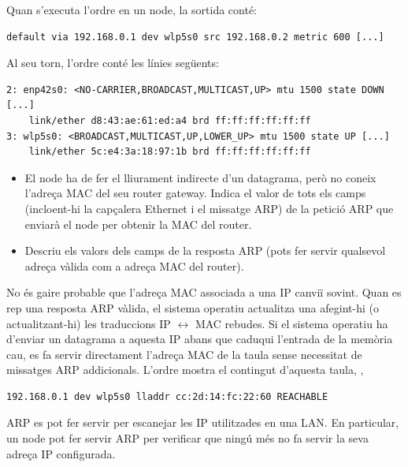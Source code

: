 \begin{exercise}
Quan s'executa l'ordre  en un node, la sortida conté:

\begin{verbatim}
default via 192.168.0.1 dev wlp5s0 src 192.168.0.2 metric 600 [...]
\end{verbatim}

Al seu torn, l'ordre  conté les línies següents:

\begin{verbatim}
2: enp42s0: <NO-CARRIER,BROADCAST,MULTICAST,UP> mtu 1500 state DOWN [...]
    link/ether d8:43:ae:61:ed:a4 brd ff:ff:ff:ff:ff:ff
3: wlp5s0: <BROADCAST,MULTICAST,UP,LOWER_UP> mtu 1500 state UP [...]
    link/ether 5c:e4:3a:18:97:1b brd ff:ff:ff:ff:ff:ff 
\end{verbatim}

\begin{itemize}
\item El node ha de fer el lliurament indirecte d'un datagrama,
però no coneix l'adreça MAC del seu router gateway. Indica el valor de 
tots els camps (incloent-hi la capçalera Ethernet i el missatge ARP) de la petició ARP 
que enviarà el node per obtenir la MAC del router.

\item Descriu els valors dels camps de la resposta ARP (pots fer servir qualsevol adreça vàlida
      com a adreça MAC del router).
\end{itemize}
\end{exercise}

No és gaire probable que l'adreça MAC associada a una IP canviï sovint.
Quan es rep una resposta ARP vàlida, el sistema operatiu actualitza una 
 afegint-hi (o actualitzant-hi) les traduccions IP $\leftrightarrow$ MAC rebudes.
% 
Si el sistema operatiu ha d'enviar un datagrama a aquesta IP abans que caduqui l'entrada de la memòria cau,
es fa servir directament l'adreça MAC de la taula sense necessitat de missatges ARP addicionals.
% 
L'ordre  mostra el contingut d'aquesta taula, \eg,
\begin{verbatim}
192.168.0.1 dev wlp5s0 lladdr cc:2d:14:fc:22:60 REACHABLE
\end{verbatim}

\begin{remark}
ARP es pot fer servir per escanejar les IP utilitzades en una LAN.
En particular, un node pot fer servir ARP per verificar que ningú més no fa servir la seva adreça IP configurada.
\end{remark}

